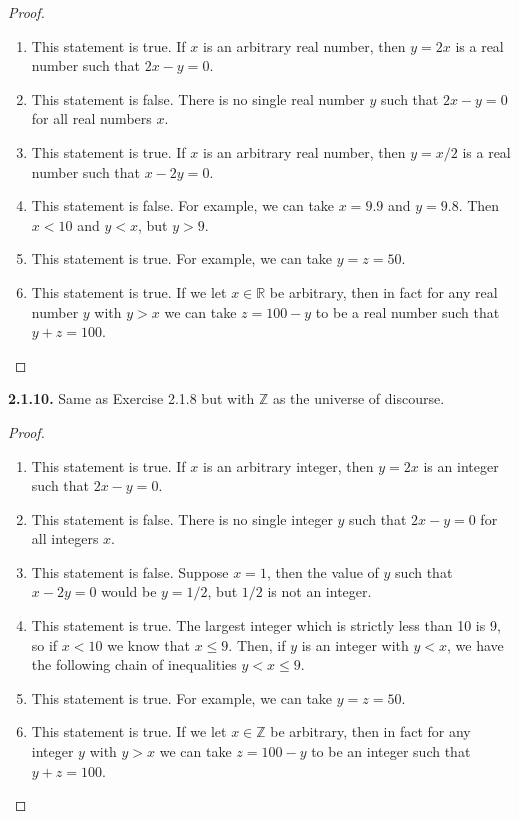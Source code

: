 \documentclass[12pt]{amsart}
\newenvironment{statement}[1]{\smallskip\noindent\color[rgb]{.6627, .3529, .6314} {\bf #1.}}{}
\theoremstyle{definition}
\theoremstyle{remark}
\newcommand{\BR}{\mathbb R}
\newcommand{\BZ}{\mathbb Z}
\begin{document}
\begin{proof}
\hfill
\begin{enumerate}
	\item This statement is true.
	If $x$ is an arbitrary real number, then $y = 2x$ is a real number such that $2x - y = 0$.
	
	\item This statement is false.
	There is no single real number $y$ such that $2x - y = 0$ for all real numbers $x$.
	
	\item This statement is true.
	If $x$ is an arbitrary real number, then $y = x/2$ is a real number such that $x - 2y = 0$.
	
	\item This statement is false.
	For example, we can take $x = 9.9$ and $y = 9.8$.
	Then $x < 10$ and $y < x$, but $y > 9$.
	
	\item This statement is true.
	For example, we can take $y = z = 50$.
	
	\item This statement is true.
	If we let $x \in \BR$ be arbitrary, then in fact for any real number $y$ with $y > x$ we can take $z = 100 - y$ to be a real number such that $y + z = 100$.
\end{enumerate}
\end{proof}


\begin{statement}{2.1.10}
Same as Exercise 2.1.8 but with $\BZ$ as the universe of discourse.
\end{statement}

\begin{proof}
\hfill
\begin{enumerate}
	\item This statement is true.
	If $x$ is an arbitrary integer, then $y = 2x$ is an integer such that $2x - y = 0$.
	
	\item This statement is false.
	There is no single integer $y$ such that $2x - y = 0$ for all integers $x$.
	
	\item This statement is false.
	Suppose $x = 1$, then the value of $y$ such that $x - 2y = 0$ would be $y = 1/2$, but $1/2$ is not an integer.
	
	\item This statement is true.
	The largest integer which is strictly less than 10 is 9, so if $x < 10$ we know that $x \leq 9$.
	Then, if $y$ is an integer with $y < x$, we have the following chain of inequalities $y < x \leq 9$.
	
	\item This statement is true.
	For example, we can take $y = z = 50$.
	
	\item This statement is true.
	If we let $x \in \BZ$ be arbitrary, then in fact for any integer $y$ with $y > x$ we can take $z = 100 - y$ to be an integer such that $y + z = 100$.
\end{enumerate}
\end{proof}
\end{document}
